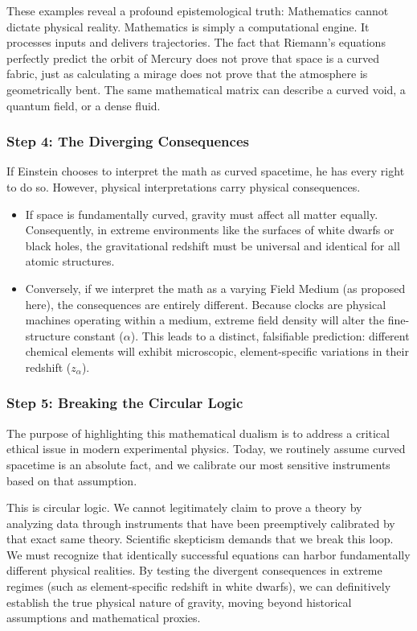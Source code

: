 \documentclass[
]{article}
\providecommand{\tightlist}{%
  \setlength{\itemsep}{0pt}\setlength{\parskip}{0pt}}
\begin{document}
These examples reveal a profound epistemological truth: Mathematics
cannot dictate physical reality. Mathematics is simply a computational
engine. It processes inputs and delivers trajectories. The fact that
Riemann's equations perfectly predict the orbit of Mercury does not
prove that space is a curved fabric, just as calculating a mirage does
not prove that the atmosphere is geometrically bent. The same
mathematical matrix can describe a curved void, a quantum field, or a
dense fluid.

\subsubsection{Step 4: The Diverging
Consequences}\label{step-4-the-diverging-consequences}

If Einstein chooses to interpret the math as curved spacetime, he has
every right to do so. However, physical interpretations carry physical
consequences.

\begin{itemize}
\tightlist
\item
  If space is fundamentally curved, gravity must affect all matter
  equally. Consequently, in extreme environments like the surfaces of
  white dwarfs or black holes, the gravitational redshift must be
  universal and identical for all atomic structures.
\item
  Conversely, if we interpret the math as a varying Field Medium (as
  proposed here), the consequences are entirely different. Because
  clocks are physical machines operating within a medium, extreme field
  density will alter the fine-structure constant (\(\alpha\)). This
  leads to a distinct, falsifiable prediction: different chemical
  elements will exhibit microscopic, element-specific variations in
  their redshift (\(z_\alpha\)).
\end{itemize}

\subsubsection{Step 5: Breaking the Circular
Logic}\label{step-5-breaking-the-circular-logic}

The purpose of highlighting this mathematical dualism is to address a
critical ethical issue in modern experimental physics. Today, we
routinely assume curved spacetime is an absolute fact, and we calibrate
our most sensitive instruments based on that assumption.

This is circular logic. We cannot legitimately claim to prove a theory
by analyzing data through instruments that have been preemptively
calibrated by that exact same theory. Scientific skepticism demands that
we break this loop. We must recognize that identically successful
equations can harbor fundamentally different physical realities. By
testing the divergent consequences in extreme regimes (such as
element-specific redshift in white dwarfs), we can definitively
establish the true physical nature of gravity, moving beyond historical
assumptions and mathematical proxies.
\end{document}
